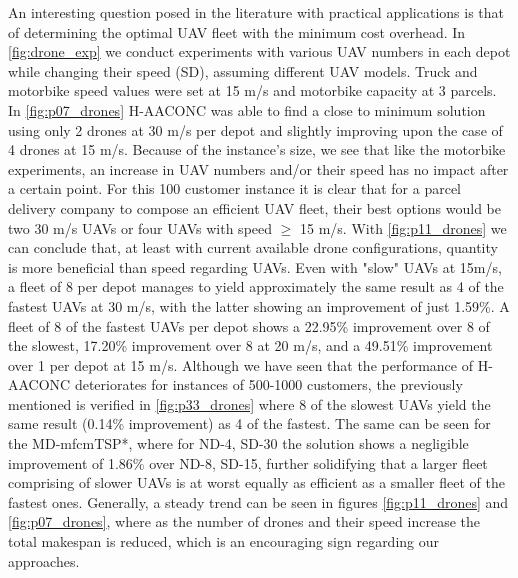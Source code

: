 \documentclass{article}
\begin{document}
	\par 
	An interesting question posed in the literature with practical applications is that of determining the optimal UAV fleet with the minimum cost overhead. In \autoref{fig:drone_exp} we conduct experiments with various UAV numbers in each depot while changing their speed (SD), assuming different UAV models. Truck and motorbike speed values were set at 15 m/s and motorbike capacity at 3 parcels. In \autoref{fig:p07_drones} H-AACONC was able to find a close to minimum solution using only 2 drones at 30 m/s per depot and slightly improving upon the case of 4 drones at 15 m/s. Because of the instance's size, we see that like the motorbike experiments, an increase in UAV numbers and/or their speed has no impact after a certain point. For this 100 customer instance it is clear that for a parcel delivery company to compose an efficient UAV fleet, their best options would be two 30 m/s UAVs or four UAVs with speed $\geq$ 15 m/s. With \autoref{fig:p11_drones} we can conclude that, at least with current available drone configurations, quantity is more beneficial than speed regarding UAVs. Even with "slow" UAVs at 15m/s, a fleet of 8 per depot manages to yield approximately the same result as 4 of the fastest UAVs at 30 m/s, with the latter showing an improvement of just 1.59\%. A fleet of 8 of the fastest UAVs per depot shows a 22.95\% improvement over 8 of the slowest, 17.20\% improvement over 8 at 20 m/s, and a 49.51\% improvement over 1 per depot at 15 m/s. 
	Although we have seen that the performance of H-AACONC deteriorates for instances of 500-1000 customers, the previously mentioned is verified in \autoref{fig:p33_drones} where 8 of the slowest UAVs yield the same result (0.14\% improvement) as 4 of the fastest. The same can be seen for the MD-mfcmTSP*, where for ND-4, SD-30 the solution shows a negligible improvement of 1.86\% over ND-8, SD-15, further solidifying that a larger fleet comprising of slower UAVs is at worst equally as  efficient as a smaller fleet of the fastest ones. Generally, a steady trend can be seen in figures \ref{fig:p11_drones} and \ref{fig:p07_drones}, where as the number of drones and their speed increase the total makespan is reduced, which is an encouraging sign regarding our approaches.
	
\end{document}
